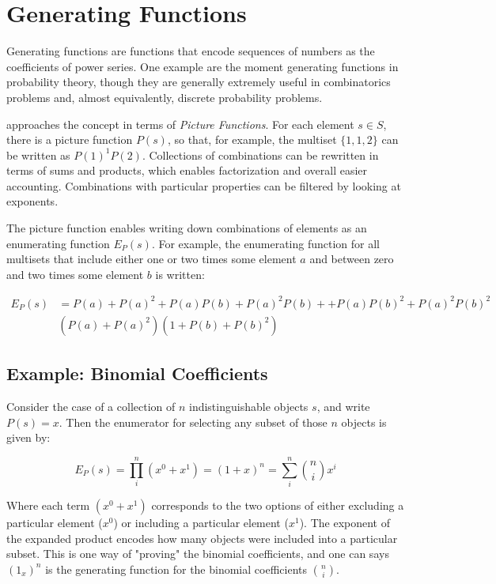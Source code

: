\section{Generating Functions}

Generating functions are functions that encode sequences of numbers as the coefficients of power series. One example are the moment generating functions in probability theory, though they are generally extremely useful in combinatorics problems and, almost equivalently, discrete probability problems. 

 approaches the concept in terms of \textit{Picture Functions}. For each element $s\in S$, there is a picture function $P(s)$, so that, for example, the multiset $\{1,1,2\}$ can be written as $P(1)^1 P(2)$. Collections of combinations can be rewritten in terms of sums and products, which enables factorization and overall easier accounting. Combinations with particular properties can be filtered by looking at exponents. 

The picture function enables writing down combinations of elements as an enumerating function $E_P(s)$. For example, the enumerating function for all multisets that include either one or two times some element $a$ and between zero and two times some element $b$ is written:

\begin{equation}
\begin{array}{rl}
E_P(s) &= P(a)+ P(a)^2 + P(a)P(b) + P(a)^2P(b) +  + P(a)P(b)^2 + P(a)^2P(b)^2\\
&\left(P(a) + P(a)^2\right)\left(1 + P(b) + P(b)^2\right)
\end{array}
\end{equation}



\subsection{Example: Binomial Coefficients}

Consider the case of a collection of $n$ indistinguishable objects $s$, and write $P(s) = x$. Then the enumerator for selecting any subset of those $n$ objects is given by: 

\begin{equation}
E_P(s) = \prod_i^n (x^0+x^1) = (1+x)^n = \sum_i^n {n \choose i}x^i
\end{equation}

Where each term $(x^0 + x^1)$ corresponds to the two options of either excluding a particular element ($x^0$) or including a particular element ($x^1$). The exponent of the expanded product encodes how many objects were included into a particular subset. This is one way of "proving" the binomial coefficients, and one can says $(1_x)^n$ is the generating function for the binomial coefficients ${n \choose i}$. 


